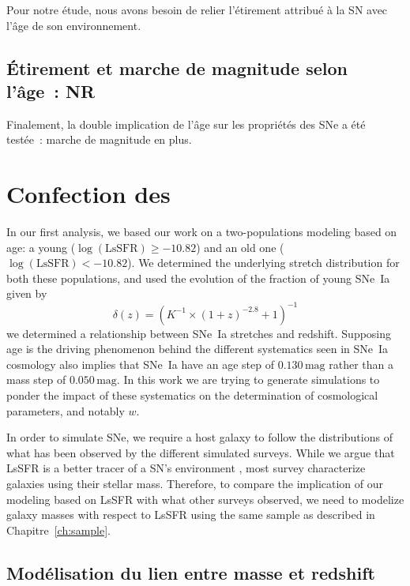 \documentclass[../main/main.tex]{subfiles}
\begin{document}
Pour notre étude, nous avons besoin de relier l'étirement attribué à la SN avec
l'âge de son environnement. 

\subsection{Étirement et marche de magnitude selon l'âge~: NR}\label{ssec:nr}

Finalement, la double implication de l'âge sur les propriétés des SNe a été
testée~: marche de magnitude en plus.

\section{Confection des \hostlib}\label{sec:hmake}

In our first analysis, we based our work on a two-populations modeling based on
age: a young ($\log(\mathrm{LsSFR}) \geq -10.82$) and an old one
($\log(\mathrm{LsSFR}) < -10.82$). We determined the underlying stretch
distribution for both these populations, and used the evolution of the fraction
of young SNe~Ia given by
\begin{equation}\label{eq:delta}
    \delta(z) = \left(K^{-1}\times\left(1+z\right)^{-2.8}+1\right)^{-1} 
\end{equation}
we determined a relationship between SNe~Ia stretches and redshift. Supposing
age is the driving phenomenon behind the different systematics seen in SNe~Ia
cosmology also implies that SNe~Ia have an age step of $0.130\,\mathrm{mag}$
rather than a mass step of $0.050\,\mathrm{mag}$. In this work we are trying to
generate simulations to ponder the impact of these systematics on the
determination of cosmological parameters, and notably $w$.

In order to simulate SNe, we require a host galaxy to follow the distributions
of what has been observed by the different simulated surveys. While we argue
that LsSFR is a better tracer of a SN's environment \citep{briday2021}, most
survey characterize galaxies using their stellar mass. Therefore, to compare the
implication of our modeling based on LsSFR with what other surveys observed, we
need to modelize galaxy masses with respect to LsSFR using the same sample as
described in Chapitre~\ref{ch:sample}.

\subsection{Modélisation du lien entre masse et redshift}\label{ssec:mmod}
\end{document}
